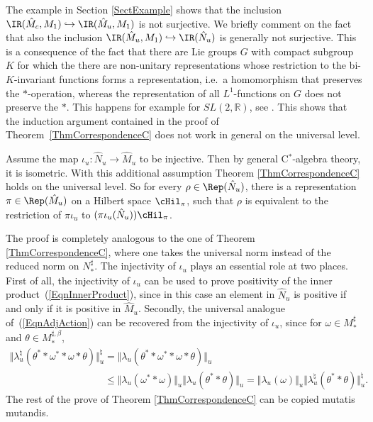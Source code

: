 The example in Section \ref{SectExample} shows that the inclusion $\IR(\hat{M}_c, M_1) \hookrightarrow \IR(\hat{M}_u, M_1)$ is not surjective. We brief\/ly comment on the fact that also the inclusion $\IR(\hat{M}_u, M_1) \hookrightarrow \IR(\hat{N}_u)$ is generally not surjective. This is a consequence of the fact that there are Lie groups $G$ with compact subgroup $K$ for which the there are non-unitary representations whose restriction to the bi-$K$-invariant functions forms a representation, i.e.\ a homomorphism that preserves the $\ast$-operation, whereas the representation of all $L^1$-functions on $G$ does not preserve the $\ast$. This happens for example for $SL(2, \mathbb{R})$, see \cite[Example~1.1.2 on p.~37 and p.~40]{Vog}.
 This shows that the induction argument contained in the proof of Theorem~\ref{ThmCorrespondenceC} does not work in general on the universal level.

\begin{rmk}\label{RmkIotaUIsNotInjective}
Assume the map $\iota_u: \hat{N}_u \rightarrow \hat{M}_u$ to be injective. Then by general C$^\ast$-algebra theory, it is isometric. With this additional assumption Theorem \ref{ThmCorrespondenceC} holds on the universal level. So for every $\rho \in \Rep(\hat{N}_u)$, there is a representation $\pi \in \Rep(\hat{M}_u)$ on a Hilbert space $\cHil_\pi$, such that $\rho$ is equivalent to the restriction of $\pi \iota_u$ to $(\pi \iota_u(\hat{N}_u))\cHil_\pi$.

The proof is completely analogous to the one of Theorem \ref{ThmCorrespondenceC}, where one takes the universal norm instead of the reduced norm on $N_\ast^\sharp$. The injectivity of $\iota_u$ plays an essential role at two places. First of all, the injectivity of $\iota_u$ can be used to prove positivity of the inner product~(\ref{EqnInnerProduct}), since in this case an element in $\hat{N}_u$ is positive if and only if it is positive in $\hat{M}_u$. Secondly, the universal analogue of~(\ref{EqnAdjAction}) can be recovered from the injectivity of $\iota_u$, since for $\omega \in M_\ast^\sharp$ and $\theta \in M_\ast^{\sharp, \beta}$,
\begin{gather*}
 \Vert \lambda_u^\natural (\theta^\ast \ast \omega^\ast \ast \omega \ast \theta) \Vert_u^\natural
 = \Vert \lambda_u (\theta^\ast \ast \omega^\ast \ast \omega \ast \theta) \Vert_u \\
\phantom{\Vert \lambda_u^\natural (\theta^\ast \ast \omega^\ast \ast \omega \ast \theta) \Vert_u^\natural}{}
 \leq   \Vert  \lambda_u(\omega^\ast \ast \omega) \Vert_u  \Vert \lambda_u (\theta^\ast  \ast \theta) \Vert_u
  = \Vert \lambda_u(\omega) \Vert_u \Vert \lambda_u^\natural (\theta^\ast  \ast \theta) \Vert_u^\natural.
\end{gather*}
The rest of the prove of Theorem \ref{ThmCorrespondenceC} can be copied mutatis mutandis.
\end{rmk}



